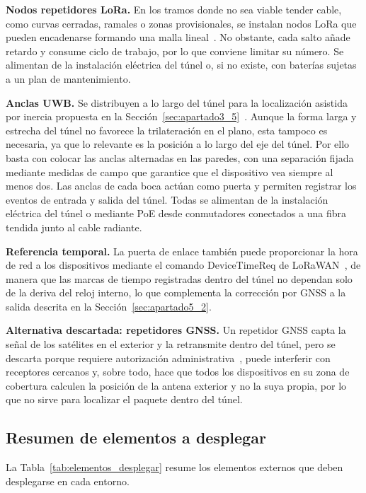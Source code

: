 \documentclass[11pt,a4paper]{article}
\begin{document}
\textbf{Nodos repetidores LoRa.} En los tramos donde no sea viable tender cable, como curvas cerradas, ramales o zonas provisionales, se instalan nodos LoRa que pueden encadenarse formando una malla lineal~\cite{ref21,ref33}. No obstante, cada salto añade retardo y consume ciclo de trabajo, por lo que conviene limitar su número. Se alimentan de la instalación eléctrica del túnel o, si no existe, con baterías sujetas a un plan de mantenimiento.

\textbf{Anclas UWB.} Se distribuyen a lo largo del túnel para la localización asistida por inercia propuesta en la Sección~\ref{sec:apartado3_5}~\cite{ref23}. Aunque la forma larga y estrecha del túnel no favorece la trilateración en el plano, esta tampoco es necesaria, ya que lo relevante es la posición a lo largo del eje del túnel. Por ello basta con colocar las anclas alternadas en las paredes, con una separación fijada mediante medidas de campo que garantice que el dispositivo vea siempre al menos dos. Las anclas de cada boca actúan como puerta y permiten registrar los eventos de entrada y salida del túnel. Todas se alimentan de la instalación eléctrica del túnel o mediante PoE desde conmutadores conectados a una fibra tendida junto al cable radiante.

\textbf{Referencia temporal.} La puerta de enlace también puede proporcionar la hora de red a los dispositivos mediante el comando DeviceTimeReq de LoRaWAN~\cite{ref35}, de manera que las marcas de tiempo registradas dentro del túnel no dependan solo de la deriva del reloj interno, lo que complementa la corrección por GNSS a la salida descrita en la Sección~\ref{sec:apartado5_2}.

\textbf{Alternativa descartada: repetidores GNSS.} Un repetidor GNSS capta la señal de los satélites en el exterior y la retransmite dentro del túnel, pero se descarta porque requiere autorización administrativa~\cite{ref41}, puede interferir con receptores cercanos y, sobre todo, hace que todos los dispositivos en su zona de cobertura calculen la posición de la antena exterior y no la suya propia, por lo que no sirve para localizar el paquete dentro del túnel.

\subsection{Resumen de elementos a desplegar}
\label{sec:apartado6_5}

La Tabla~\ref{tab:elementos_desplegar} resume los elementos externos que deben desplegarse en cada entorno.
\end{document}

